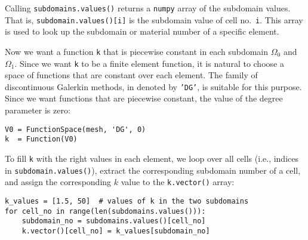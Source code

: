 Calling {\fontsize{12pt}{12pt}\texttt{subdomains.values()}} returns a {\fontsize{12pt}{12pt}\texttt{numpy}} array of the
subdomain values. That is, {\fontsize{12pt}{12pt}\texttt{subdomain.values()[i]}} is
the subdomain value of cell no.~{\fontsize{12pt}{12pt}\texttt{i}}. This array is used to
look up the subdomain or material number of a specific element.

Now we want a function {\fontsize{12pt}{12pt}\texttt{k}} that is piecewise constant in
each subdomain $\Omega_0$ and $\Omega_1$. Since we want {\fontsize{12pt}{12pt}\texttt{k}}
to be a finite element function, it is natural to choose
a space of functions that are constant over each element.
The family of discontinuous Galerkin methods, in \fenics{} 
denoted by {\fontsize{12pt}{12pt}\texttt{'DG'}}, is suitable for this purpose. Since we
want functions that are piecewise constant, the value of
the degree parameter is zero:
\begin{Verbatim}[fontsize=\fontsize{10pt}{10pt},tabsize=8,baselinestretch=1.05,
fontfamily=tt,xleftmargin=7mm]
V0 = FunctionSpace(mesh, 'DG', 0)
k  = Function(V0)
\end{Verbatim}
\noindent
To fill {\fontsize{12pt}{12pt}\texttt{k}} with the right values in each element, we loop over
all cells (i.e., indices in {\fontsize{12pt}{12pt}\texttt{subdomain.values()}}),
extract the corresponding subdomain number of a cell,
and assign the corresponding $k$ value to the {\fontsize{12pt}{12pt}\texttt{k.vector()}} array:
\begin{Verbatim}[fontsize=\fontsize{10pt}{10pt},tabsize=8,baselinestretch=1.05,
fontfamily=tt,xleftmargin=7mm]
k_values = [1.5, 50]  # values of k in the two subdomains
for cell_no in range(len(subdomains.values())):
    subdomain_no = subdomains.values()[cell_no]
    k.vector()[cell_no] = k_values[subdomain_no]
\end{Verbatim}
\noindent

